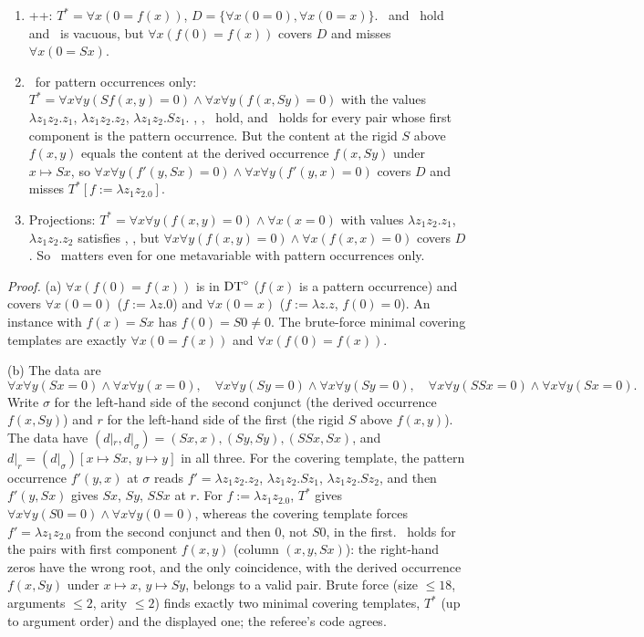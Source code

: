 \begin{proposition}\label{prop:single:weaker}
\leavevmode
\begin{enumerate}[label=(\alph*)]
\item \evR+\evN+\evD: $T^*=\forall x(0=f(x))$, $D=\{\forall x(0=0),\forall x(0=x)\}$. \evRs\ and \evN\ hold and \evD\ is vacuous, but $\forall x(f(0)=f(x))$ covers $D$ and misses $\forall x(0=Sx)$.
\item \evU\ for pattern occurrences only: $T^*=\forall x\forall y(Sf(x,y)=0)\wedge\forall x\forall y(f(x,Sy)=0)$ with the values $\lambda z_1z_2.z_1$, $\lambda z_1z_2.z_2$, $\lambda z_1z_2.Sz_1$. \evRs, \evN, \evD\ hold, and \evU\ holds for every pair whose first component is the pattern occurrence. But the content at the rigid $S$ above $f(x,y)$ equals the content at the derived occurrence $f(x,Sy)$ under $x\mapsto Sx$, so $\forall x\forall y(f'(y,Sx)=0)\wedge\forall x\forall y(f'(y,x)=0)$ covers $D$ and misses $T^*[f:=\lambda z_1z_2.0]$.
\item Projections: $T^*=\forall x\forall y(f(x,y)=0)\wedge\forall x(x=0)$ with values $\lambda z_1z_2.z_1$, $\lambda z_1z_2.z_2$ satisfies \evRs, \evN, but $\forall x\forall y(f(x,y)=0)\wedge\forall x(f(x,x)=0)$ covers $D$. So \evU\ matters even for one metavariable with pattern occurrences only.
\end{enumerate}
\end{proposition}

\noindent\emph{Proof.} (a) $\forall x(f(0)=f(x))$ is in $\mathrm{DT}^{\circ}$ ($f(x)$ is a pattern occurrence) and covers $\forall x(0=0)$ ($f:=\lambda z.0$) and $\forall x(0=x)$ ($f:=\lambda z.z$, $f(0)=0$). An instance with $f(x)=Sx$ has $f(0)=S0\neq0$. The brute-force minimal covering templates are exactly $\forall x(0=f(x))$ and $\forall x(f(0)=f(x))$.

(b) The data are
\[
\forall x\forall y(Sx=0)\wedge\forall x\forall y(x=0),\quad \forall x\forall y(Sy=0)\wedge\forall x\forall y(Sy=0),\quad \forall x\forall y(SSx=0)\wedge\forall x\forall y(Sx=0).
\]
Write $\sigma$ for the left-hand side of the second conjunct (the derived occurrence $f(x,Sy)$) and $r$ for the left-hand side of the first (the rigid $S$ above $f(x,y)$). The data have $(d|_r,d|_\sigma)=(Sx,x),(Sy,Sy),(SSx,Sx)$, and $d|_r=(d|_\sigma)[x\mapsto Sx,\,y\mapsto y]$ in all three. For the covering template, the pattern occurrence $f'(y,x)$ at $\sigma$ reads $f'=\lambda z_1z_2.z_2$, $\lambda z_1z_2.Sz_1$, $\lambda z_1z_2.Sz_2$, and then $f'(y,Sx)$ gives $Sx$, $Sy$, $SSx$ at $r$. For $f:=\lambda z_1z_2.0$, $T^*$ gives $\forall x\forall y(S0=0)\wedge\forall x\forall y(0=0)$, whereas the covering template forces $f'=\lambda z_1z_2.0$ from the second conjunct and then $0$, not $S0$, in the first. \evU\ holds for the pairs with first component $f(x,y)$ (column $(x,y,Sx)$): the right-hand zeros have the wrong root, and the only coincidence, with the derived occurrence $f(x,Sy)$ under $x\mapsto x$, $y\mapsto Sy$, belongs to a valid pair. Brute force (size $\le18$, arguments $\le2$, arity $\le2$) finds exactly two minimal covering templates, $T^*$ (up to argument order) and the displayed one; the referee's code agrees.


